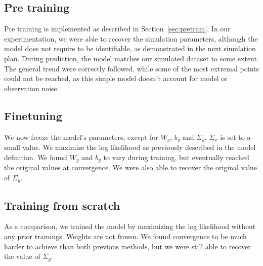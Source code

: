 \documentclass[10pt,a4paper]{report}
\begin{document}
\subsection{Pre training}
Pre training is implemented as described in Section~\ref{sec:pretrain}.
In our experimentation, we were able to recover the simulation parameters, although the model does not require to be identifiable, as demonstrated in the next simulation plan.
During prediction, the model matches our simulated dataset to some extent.
The general trend were correctly followed, while some of the most extremal points could not be reached, as this simple model doesn't account for model or observation noise.

\subsection{Finetuning}
We now freeze the model's parameters, except for $W_y$, $b_y$ and $\Sigma_y$.
$\Sigma_x$ is set to a small value.
We maximize the log likelihood as previously described in the model definition.
We found $W_y$ and $b_y$ to vary during training, but eventually reached the original values at convergence.
We were also able to recover the original value of $\Sigma_y$.

\subsection{Training from scratch}
As a comparison, we trained the model by maximizing the log likelihood without any prior trainings.
Weights are not frozen.
We found convergence to be much harder to achieve than both previous methods, but we were still able to recover the value of $\Sigma_y$.
\end{document}

